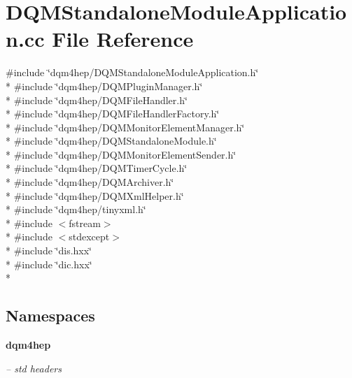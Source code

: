 \section{D\+Q\+M\+Standalone\+Module\+Application.\+cc File Reference}
\label{DQMStandaloneModuleApplication_8cc}
{\ttfamily \#include \char`\"{}dqm4hep/\+D\+Q\+M\+Standalone\+Module\+Application.\+h\char`\"{}}\\*
{\ttfamily \#include \char`\"{}dqm4hep/\+D\+Q\+M\+Plugin\+Manager.\+h\char`\"{}}\\*
{\ttfamily \#include \char`\"{}dqm4hep/\+D\+Q\+M\+File\+Handler.\+h\char`\"{}}\\*
{\ttfamily \#include \char`\"{}dqm4hep/\+D\+Q\+M\+File\+Handler\+Factory.\+h\char`\"{}}\\*
{\ttfamily \#include \char`\"{}dqm4hep/\+D\+Q\+M\+Monitor\+Element\+Manager.\+h\char`\"{}}\\*
{\ttfamily \#include \char`\"{}dqm4hep/\+D\+Q\+M\+Standalone\+Module.\+h\char`\"{}}\\*
{\ttfamily \#include \char`\"{}dqm4hep/\+D\+Q\+M\+Monitor\+Element\+Sender.\+h\char`\"{}}\\*
{\ttfamily \#include \char`\"{}dqm4hep/\+D\+Q\+M\+Timer\+Cycle.\+h\char`\"{}}\\*
{\ttfamily \#include \char`\"{}dqm4hep/\+D\+Q\+M\+Archiver.\+h\char`\"{}}\\*
{\ttfamily \#include \char`\"{}dqm4hep/\+D\+Q\+M\+Xml\+Helper.\+h\char`\"{}}\\*
{\ttfamily \#include \char`\"{}dqm4hep/tinyxml.\+h\char`\"{}}\\*
{\ttfamily \#include $<$fstream$>$}\\*
{\ttfamily \#include $<$stdexcept$>$}\\*
{\ttfamily \#include \char`\"{}dis.\+hxx\char`\"{}}\\*
{\ttfamily \#include \char`\"{}dic.\+hxx\char`\"{}}\\*
\subsection*{Namespaces}
\begin{DoxyCompactItemize}
\item 
 {\bf dqm4hep}
\begin{DoxyCompactList}\small\item\em -- std headers \end{DoxyCompactList}\end{DoxyCompactItemize}
